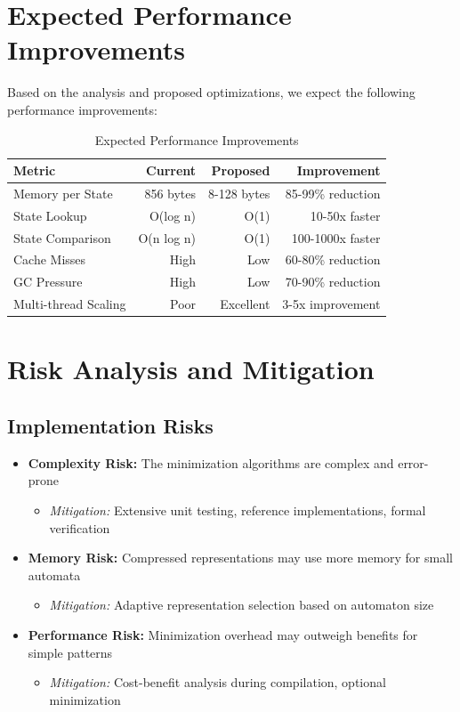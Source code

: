 \documentclass[11pt,a4paper]{article}
\begin{document}
\section{Expected Performance Improvements}

Based on the analysis and proposed optimizations, we expect the following performance improvements:

\begin{table}[H]
\centering
\begin{tabular}{@{}lrrr@{}}
\toprule
\textbf{Metric} & \textbf{Current} & \textbf{Proposed} & \textbf{Improvement} \\
\midrule
Memory per State & 856 bytes & 8-128 bytes & 85-99\% reduction \\
State Lookup & O(log n) & O(1) & 10-50x faster \\
State Comparison & O(n log n) & O(1) & 100-1000x faster \\
Cache Misses & High & Low & 60-80\% reduction \\
GC Pressure & High & Low & 70-90\% reduction \\
Multi-thread Scaling & Poor & Excellent & 3-5x improvement \\
\bottomrule
\end{tabular}
\caption{Expected Performance Improvements}
\label{tab:improvements}
\end{table}

\section{Risk Analysis and Mitigation}

\subsection{Implementation Risks}

\begin{itemize}
    \item \textbf{Complexity Risk:} The minimization algorithms are complex and error-prone
    \begin{itemize}
        \item \textit{Mitigation:} Extensive unit testing, reference implementations, formal verification
    \end{itemize}
    
    \item \textbf{Memory Risk:} Compressed representations may use more memory for small automata
    \begin{itemize}
        \item \textit{Mitigation:} Adaptive representation selection based on automaton size
    \end{itemize}
    
    \item \textbf{Performance Risk:} Minimization overhead may outweigh benefits for simple patterns
    \begin{itemize}
        \item \textit{Mitigation:} Cost-benefit analysis during compilation, optional minimization
    \end{itemize}
\end{itemize}
\end{document}
